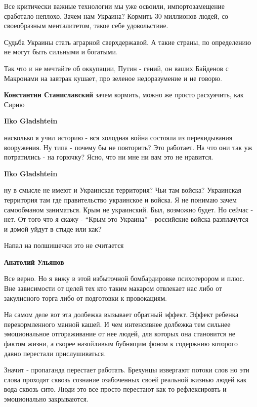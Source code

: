 \begin{itemize}
\begin{itemize}
Все критически важные технологии мы уже освоили, импортозамещение сработало
неплохо. Зачем нам Украина? Кормить 30 миллионов людей, со своеобразным
менталитетом, такое себе удовольствие.

Судьба Украины стать аграрной сверхдержавой. А такие страны, по определению не
могут быть сильными и богатыми.

Так что и не мечтайте об оккупации, Путин - гений, он ваших Байденов с
Макронами на завтрак кушает, про зеленое недоразумение и не говорю.

\textbf{Константин Станиславский} зачем кормить, можно же просто расхуячить, как Сирию

\textbf{Ilko Gladshtein} 

насколько я учил историю - вся холодная война состояла из перекидывания
вооружения. Ну типа - почему бы не повторить? Это работает. На что они так уж
потратились - на горючку? Ясно, что ни мне ни вам это не нравится.

\textbf{Ilko Gladshtein} 

ну в смысле не имеют и Украинская территория? Чьи там войска? Украинская
территория там где правительство украинское и войска. Я не понимаю зачем
самообманом заниматься. Крым не украинский. Был, возможно будет. Но сейчас -
нет. От того что я скажу - \enquote{Крым это Украина} - российские войска разплачутся и
домой уйдут в стыде или как?

\end{itemize} %

Напал на полшишечки это не считается

\textbf{Анатолий Ульянов} 

Все верно. Но я вижу в этой избыточной бомбардировке психотерором и плюс. Вне
зависимости от целей тех кто таким макаром отвлекает нас либо от закулисного
торга либо от подготовки к провокациям.

На самом деле вот эта долбежка вызывает обратный эффект. Эффект ребенка
перекормленного манной кашей. И чем интенсивнее долбежка тем сильнее
эмоциональное отгораживание от нее людей, для которых она становится не фактом
жизни, а скорее назойливым бубнящим фоном к содержнию которого давно перестали
прислушиваться.

Значит - пропаганда перестает работать. Брехунцы извергают потоки слов но эти
слова проходят сквозь сознание озабоченных своей реальной жизнью людей как вода
сквозь сито. Люди это все просто перестают как то рефлексировть и эмоционально
закрываются.


\end{itemize}

